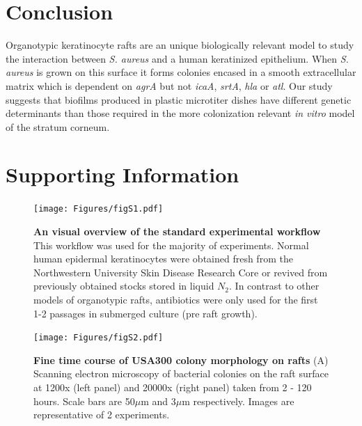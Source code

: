 \documentclass[10pt,letterpaper]{article}
\newcommand{\beginsupplement}{%
        \setcounter{table}{0}
        \renewcommand{\thetable}{S\arabic{table}}%
        \setcounter{figure}{0}
        \renewcommand{\thefigure}{S\arabic{figure}}%
     }
\begin{document}
\section*{Conclusion}
Organotypic keratinocyte rafts are an unique biologically relevant model to study the interaction between \textit{S. aureus} and a human keratinized epithelium.
When \textit{S. aureus} is grown on this surface it forms colonies encased in a smooth extracellular matrix which is dependent on \textit{agrA} but not \textit{icaA}, \textit{srtA}, \textit{hla} or \textit{atl}.
Our study suggests that biofilms produced in plastic microtiter dishes have different genetic determinants than those required in the more colonization relevant \textit{in vitro} model of the stratum corneum.

\beginsupplement

\section*{Supporting Information}

\begin{figure}[H]
\begin{adjustwidth}{-2.25in}{0in}
\texttt{[image: Figures/figS1.pdf]}
\caption[An visual overview of the standard experimental workflow]{
\textbf{An visual overview of the standard experimental workflow}
This workflow was used for the majority of experiments. Normal human epidermal keratinocytes were obtained fresh from the Northwestern University Skin Disease Research Core or revived from previously obtained stocks stored in liquid $N_2$. In contrast to other models of organotypic rafts, antibiotics were only used for the first 1-2 passages in submerged culture (pre raft growth).}
\label{figS1}
\end{adjustwidth}
\end{figure}

\begin{figure}[H]
\begin{adjustwidth}{-2.25in}{0in}
\texttt{[image: Figures/figS2.pdf]}
\caption[Fine time course of USA300 colony morphology on rafts]{
\textbf{Fine time course of USA300 colony morphology on rafts} 
	(A) Scanning electron microscopy of bacterial colonies on the raft surface at 1200x (left panel) and 20000x (right panel) taken from 2 - 120 hours. Scale bars are 50$\mu$m and 3$\mu$m respectively. Images are representative of 2 experiments.}
    \label{figS2}
    \end{adjustwidth}
\end{figure}
\end{document}
